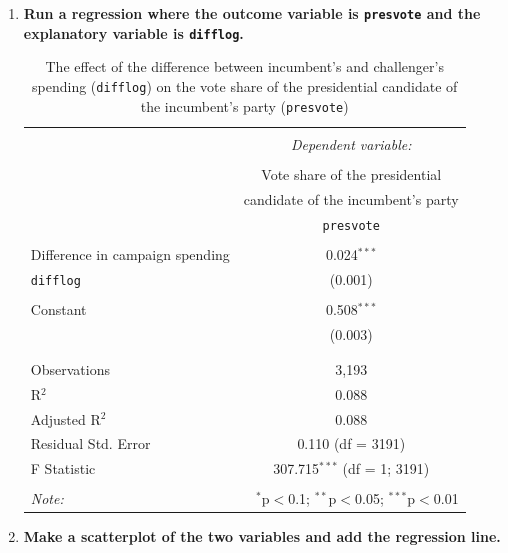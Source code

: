 \documentclass[12pt,letterpaper]{article}
\begin{document}
\begin{enumerate}
	\item \textbf{Run a regression where the outcome variable is \texttt{presvote} and the explanatory variable is \texttt{difflog}.}

		

		\begin{table}[H] \centering 
			\caption{The effect of the difference between incumbent's and challenger's spending (\texttt{difflog}) on the vote share of the presidential candidate of the incumbent's party (\texttt{presvote})} 
			\label{} 
			\begin{tabular}{@{\extracolsep{5pt}}lc} 
				\\[-1.8ex]\hline 
				\hline \\[-1.8ex] 
				& \multicolumn{1}{c}{\textit{Dependent variable:}} \\ 
				\cline{2-2} 
				\\[-1.8ex] & Vote share of the presidential \\ 
				& candidate of the incumbent's party \\ 
				& \texttt{presvote} \\
				\hline \\[-1.8ex] 
				Difference in campaign spending & 0.024$^{***}$ \\ 
				\texttt{difflog} & (0.001) \\ 
				& \\ 
				Constant & 0.508$^{***}$ \\ 
				& (0.003) \\ 
				& \\ 
				\hline \\[-1.8ex] 
				Observations & 3,193 \\ 
				R$^{2}$ & 0.088 \\ 
				Adjusted R$^{2}$ & 0.088 \\ 
				Residual Std. Error & 0.110 (df = 3191) \\ 
				F Statistic & 307.715$^{***}$ (df = 1; 3191) \\ 
				\hline 
				\hline \\[-1.8ex] 
				\textit{Note:}  & \multicolumn{1}{r}{$^{*}$p$<$0.1; $^{**}$p$<$0.05; $^{***}$p$<$0.01} \\ 
			\end{tabular} 
		\end{table} 
	
	\item \textbf{Make a scatterplot of the two variables and add the regression line.}
	

\end{enumerate}
\end{document}
